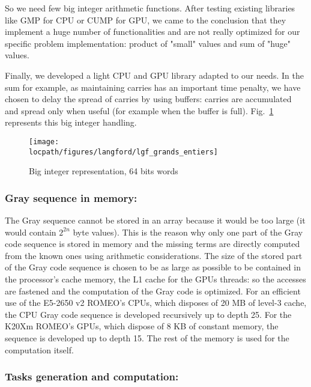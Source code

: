 So we need few big integer arithmetic functions. After testing existing libraries like GMP for CPU or CUMP for GPU, we came to the conclusion that they implement a huge number of functionalities and are not really optimized for our specific problem implementation: product of "small" values and sum of "huge" values. 

Finally, we developed a light CPU and GPU library adapted to our needs.
In the sum for example, as maintaining carries has an important time penalty, we have chosen to delay the spread of carries by using buffers: carries are accumulated and spread only when useful (for example when the buffer is full).
Fig.~\ref{fig:big-integer} represents this big integer handling.
\begin{figure}[htbp]
\centering
\texttt{[image: \\locpath/figures/langford/lgf\_grands\_entiers]}
\caption{Big integer representation, 64 bits words}
\label{fig:big-integer}
\end{figure}


\subsubsection{Gray sequence in memory: }
The Gray sequence cannot be stored in an array because it would be too large (it would contain $2^{2n}$ byte values). This is the reason why only one part of the Gray code sequence is stored in memory and the missing terms are directly computed from the known ones using arithmetic considerations.
The size of the stored part of the Gray code sequence is chosen to be as large as possible to be contained in the processor's cache memory, the L1 cache for the GPUs threads: so the accesses are fastened and the computation of the Gray code is optimized.
For an efficient use of the E5-2650 v2 ROMEO's CPUs, which disposes of 20 MB of level-3 cache, the CPU Gray code sequence is developed recursively up to depth 25. For the K20Xm ROMEO's GPUs, which dispose of 8 KB of constant memory, the sequence is developed up to depth 15. The rest of the memory is used for the computation itself. 

\subsubsection{Tasks generation and computation: }
\label{sec:tasks}

